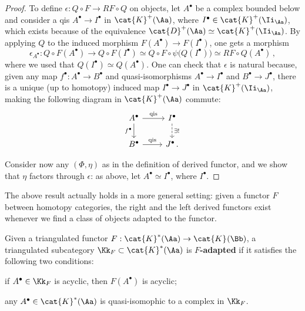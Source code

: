 \begin{prop}
\begin{proof}
        To define $\epsilon: Q \circ F \to RF \circ Q$
        on objects, let $A^{\bullet}$ be a complex bounded below
        and consider a qis $A^{\bullet} \to I^{\bullet}$
        in $\cat{K}^{+}(\Aa)$, 
        where $I^{\bullet} \in \cat{K}^{+}(\Ii_{\Aa})$,
        which exists because of the equivalence 
        $\cat{D}^{+}(\Aa) \simeq \cat{K}^{+}(\Ii_{\Aa})$.
        By applying $Q$ to the induced morphism 
        $F(A^{\bullet}) \to F(I^{\bullet})$, one gets a morphism
        \begin{equation*}
            \epsilon_{A^{\bullet}} :
            Q \circ F(A^{\bullet}) 
            \longrightarrow Q \circ F(I^{\bullet}) 
            \simeq Q \circ F \circ \psi \big( Q(I^{\bullet}) \big)
            \simeq RF \circ Q (A^{\bullet})\,,
        \end{equation*}
        where we used that $Q(I^{\bullet}) \simeq Q(A^{\bullet})$.
        One can check that $\epsilon$ is natural because,
        given any map $f^{\bullet} : A^{\bullet} \to B^{\bullet}$
        and quasi-isomorphisms $A^{\bullet} \to I^{\bullet}$
        and $B^{\bullet} \to J^{\bullet}$, there is a unique
        (up to homotopy) induced map $I^{\bullet} \to J^{\bullet}$
        in $\cat{K}^{+}(\Ii_{\Aa})$, 
        making the following diagram in $\cat{K}^{+}(\Aa)$ commute:
        \begin{equation*}
            \begin{tikzcd}
                A^{\bullet} \ar[r, "\textrm{qis}"] \ar[d, "f^{\bullet}"']
                & I^{\bullet} \ar[d, dashed, "\exists !"] \\
                B^{\bullet} \ar[r, "\textrm{qis}"] & J^{\bullet}\,.
            \end{tikzcd}
        \end{equation*}

        Consider now any $(\Phi,\eta)$ as in the definition of derived functor,
        and we show that $\eta$ factors through $\epsilon$:
        as above, let $A^{\bullet} \simeq I^{\bullet}$, where $I^{\bullet}$.
    \end{proof}
\end{prop}

The above result actually holds in a more general setting:
given a functor $F$ between homotopy categories,
the right and the left derived functors exist whenever
we find a class of objects adapted to the functor.

\begin{df}
    Given a triangulated functor $F:\cat{K}^{*}(\Aa) \to \cat{K}^{}(\Bb)$,
    a triangulated subcategory $\Kk_{F} \subset \cat{K}^{*}(\Aa)$
    is \textbf{$F$-adapted} if it satisfies the following two conditions:
    \begin{rmnumerate}
        \item if $A^{\bullet} \in \Kk_{F}$ is acyclic,
        then $F(A^{\bullet})$ is acyclic;

        \item any $A^{\bullet} \in \cat{K}^{*}(\Aa)$ is quasi-isomophic
        to a complex in $\Kk_{F}$.
    \end{rmnumerate}
\end{df}

